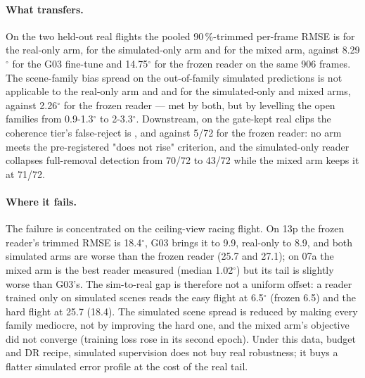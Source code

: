\paragraph{What transfers.} On the two held-out real flights the pooled 90\,\%-trimmed per-frame
RMSE is \LTwoRealA{} for the real-only arm, \LTwoRealB{} for the simulated-only arm and
\LTwoRealC{} for the mixed arm, against 8.29$^\circ$ for the G03 fine-tune and 14.75$^\circ$ for
the frozen reader on the same 906 frames. The scene-family bias spread on the out-of-family
simulated predictions is not applicable to the real-only arm and \LTwoSpreadB{} and \LTwoSpreadC{}
for the simulated-only and mixed arms, against 2.26$^\circ$ for the frozen reader --- met by both,
but by levelling the open families from 0.9-1.3$^\circ$ to 2-3.3$^\circ$. Downstream, on the gate-kept real clips the coherence tier's false-reject is
\LTwoDownA{}, \LTwoDownB{} and \LTwoDownC{} against 5/72 for the frozen reader: no arm meets the
pre-registered "does not rise" criterion, and the simulated-only reader collapses full-removal
detection from 70/72 to 43/72 while the mixed arm keeps it at 71/72.

\paragraph{Where it fails.} The failure is concentrated on the ceiling-view racing flight. On
13p the frozen reader's trimmed RMSE is 18.4$^\circ$, G03 brings it to 9.9, real-only to 8.9, and
both simulated arms are worse than the frozen reader (25.7 and 27.1); on 07a the mixed arm is the
best reader measured (median 1.02$^\circ$) but its tail is slightly worse than G03's. The
sim-to-real gap is therefore not a uniform offset: a reader trained only on simulated scenes reads
the easy flight at 6.5$^\circ$ (frozen 6.5) and the hard flight at 25.7 (18.4). The simulated
scene spread is reduced by making every family mediocre, not by improving the hard one, and the
mixed arm's objective did not converge (training loss rose in its second epoch). Under this data,
budget and DR recipe, simulated supervision does not buy real robustness; it buys a flatter
simulated error profile at the cost of the real tail.
